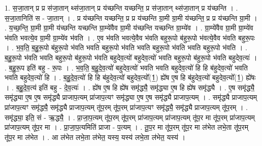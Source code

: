 \documentclass[17pt]{extarticle}
\begin{document}
1. स॒जा॒तान् प्र प्र स॑जा॒तान् थ्स॑जा॒तान् प्र य॑च्छन्ति यच्छन्ति॒ प्र स॑जा॒तान् थ्स॑जा॒तान् प्र य॑च्छन्ति । . स॒जा॒तानिति॑ स - जा॒तान् । . प्र य॑च्छन्ति यच्छन्ति॒ प्र प्र य॑च्छन्ति ग्रा॒मी ग्रा॒मी य॑च्छन्ति॒ प्र प्र य॑च्छन्ति ग्रा॒मी । . य॒च्छ॒न्ति॒ ग्रा॒मी ग्रा॒मी य॑च्छन्ति यच्छन्ति ग्रा॒म्ये॑वैव ग्रा॒मी य॑च्छन्ति यच्छन्ति ग्रा॒म्ये॑व । . ग्रा॒म्ये॑वैव ग्रा॒मी ग्रा॒म्ये॑व भ॑वति भवत्ये॒व ग्रा॒मी ग्रा॒म्ये॑व भ॑वति । . ए॒व भ॑वति भवत्ये॒वैव भ॑वति बहुरू॒पो ब॑हुरू॒पो भ॑वत्ये॒वैव भ॑वति बहुरू॒पः । . भ॒व॒ति॒ ब॒हु॒रू॒पो ब॑हुरू॒पो भ॑वति भवति बहुरू॒पो भ॑वति भवति बहुरू॒पो भ॑वति भवति बहुरू॒पो भ॑वति । . ब॒हु॒रू॒पो भ॑वति भवति बहुरू॒पो ब॑हुरू॒पो भ॑वति बहुदेव॒त्यो॑ बहुदेव॒त्यो॑ भवति बहुरू॒पो ब॑हुरू॒पो भ॑वति बहुदेव॒त्यः॑ । . ब॒हु॒रू॒प इति॑ बहु - रू॒पः । . भ॒व॒ति॒ ब॒हु॒दे॒व॒त्यो॑ बहुदेव॒त्यो॑ भवति भवति बहुदेव॒त्यो॑ हि हि ब॑हुदेव॒त्यो॑ भवति भवति बहुदेव॒त्यो॑ हि । . ब॒हु॒दे॒व॒त्यो॑ हि हि ब॑हुदेव॒त्यो॑ बहुदेव॒त्यो᳚(1॒) ह्ये॑ष ए॒ष हि ब॑हुदेव॒त्यो॑ बहुदेव॒त्यो᳚(1॒) ह्ये॑षः । . ब॒हु॒दे॒व॒त्य॑ इति॑ बहु - दे॒व॒त्यः॑ । . ह्ये॑ष ए॒ष हि ह्ये॑ष समृ॑द्ध्यै॒ समृ॑द्ध्या ए॒ष हि ह्ये॑ष समृ॑द्ध्यै । . ए॒ष समृ॑द्ध्यै॒ समृ॑द्ध्या ए॒ष ए॒ष समृ॑द्ध्यै प्राजाप॒त्यम् प्रा॑जाप॒त्यꣳ समृ॑द्ध्या ए॒ष ए॒ष समृ॑द्ध्यै प्राजाप॒त्यम् । . समृ॑द्ध्यै प्राजाप॒त्यम् प्रा॑जाप॒त्यꣳ समृ॑द्ध्यै॒ समृ॑द्ध्यै प्राजाप॒त्यम् तू॑प॒रम् तू॑प॒रम् प्रा॑जाप॒त्यꣳ समृ॑द्ध्यै॒ समृ॑द्ध्यै प्राजाप॒त्यम् तू॑प॒रम् । . समृ॑द्ध्या॒ इति॒ सं - ऋ॒द्ध्यै॒ । . प्रा॒जा॒प॒त्यम् तू॑प॒रम् तू॑प॒रम् प्रा॑जाप॒त्यम् प्रा॑जाप॒त्यम् तू॑प॒र मा तू॑प॒रम् प्रा॑जाप॒त्यम् प्रा॑जाप॒त्यम् तू॑प॒र मा । . प्रा॒जा॒प॒त्यमिति॑ प्राजा - प॒त्यम् । . तू॒प॒र मा तू॑प॒रम् तू॑प॒र मा ल॑भेत लभे॒ता तू॑प॒रम् तू॑प॒र मा ल॑भेत । . आ ल॑भेत लभे॒ता ल॑भेत॒ यस्य॒ यस्य॑ लभे॒ता ल॑भेत॒ यस्य॑ । \newline
\end{document}
